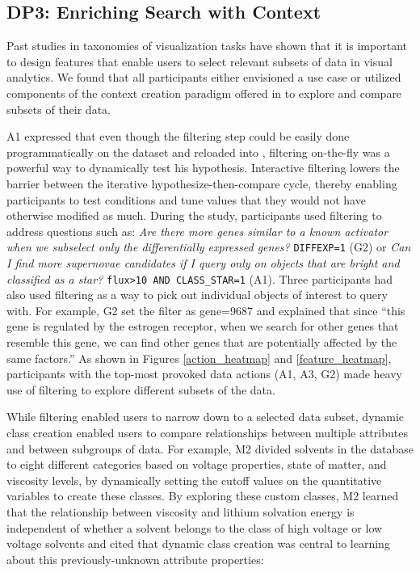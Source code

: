 \subsection{DP3: Enriching Search with Context}
\par Past studies in taxonomies of visualization tasks have shown that it is important to design features that enable users to select relevant subsets of data in visual analytics\cite{Amar2005,Heer2012}. %
We found that all participants either envisioned a use case or utilized components of the context creation paradigm offered in \zv to explore and compare subsets of their data.
\par A1 expressed that even though the filtering step could be easily done programmatically on the dataset and reloaded into \zv, filtering on-the-fly was a powerful way to dynamically test his hypothesis. Interactive filtering lowers the barrier between the iterative hypothesize-then-compare cycle, thereby enabling participants to test conditions and tune values that they would not have otherwise modified as much.
During the study, participants used filtering to address questions such as: \textit{Are there more genes similar to a known activator when we subselect only the differentially expressed genes?} \texttt{DIFFEXP=1} (G2) or \textit{Can I find more supernovae candidates if I query only on objects that are bright and classified as a star?} \texttt{flux\textgreater10 AND CLASS\_STAR=1} (A1). Three participants had also used filtering as a way to pick out individual objects of interest to query with. For example, G2 set the filter as gene=9687 and explained that since ``this gene is regulated by the estrogen receptor, when we search for other genes that resemble this gene, we can find other genes that are potentially affected by the same factors.''
As shown in Figures \ref{action_heatmap} and \ref{feature_heatmap}, participants with the top-most provoked data actions (A1, A3, G2) made heavy use of filtering to explore different subsets of the data.
\par While filtering enabled users to narrow down to a selected data subset, dynamic class creation enabled users to compare relationships between multiple attributes and between subgroups of data. For example, M2 divided solvents in the database to eight different categories based on voltage properties, state of matter, and viscosity levels, by dynamically setting the cutoff values on the quantitative variables to create these classes. By exploring these custom classes, M2 learned that the relationship between viscosity and lithium solvation energy is independent of whether a solvent belongs to the class of high voltage or low voltage solvents and cited that dynamic class creation was central to learning about this previously-unknown attribute properties:
